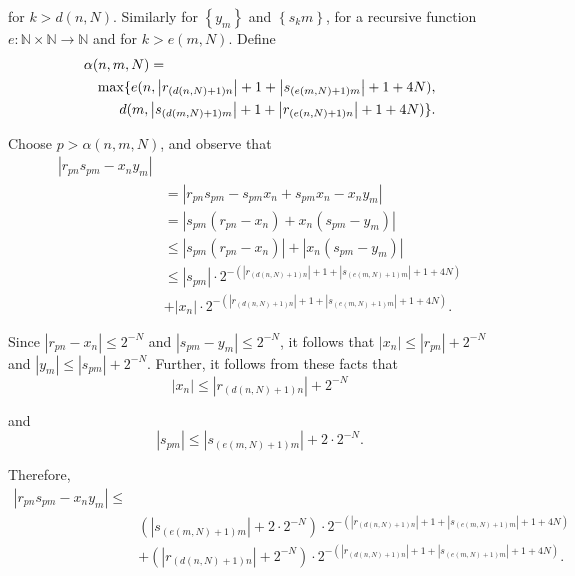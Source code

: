 \documentclass[a4paper,10pt]{article}
\begin{document}
for $k > d(n, N)$.  Similarly for $\left\{y_m\right\}$ and $\left\{s_km\right\}$, for a recursive function \newline$e:\mathbb{N}\times\mathbb{N}\to\mathbb{N}$ and for $k > e(m, N)$.  Define
\begin{align*}
 \lefteqn{\alpha(n,m,N) = } \\
 & & \max\{e(n,\left|r_{(d(n,N)+1)n}\right| + 1 + \left|s_{(e(m,N)+1)m}\right| + 1 + 4N), \\
 & & d(m,\left|s_{(d(m,N)+1)m}\right| + 1 + \left|r_{(e(n,N)+1)n}\right| + 1 + 4N)\}.
\end{align*}


Choose $p > \alpha(n,m,N)$, and observe that
\begin{align*}
\left|r_{pn}s_{pm} - x_{n}y_{m}\right| \\
& = \left|r_{pn}s_{pm} - s_{pm}x_n + s_{pm}x_n - x_{n}y_{m}\right|  \\
& = \left|s_{pm}\left(r_{pn} - x_n\right) + x_n\left(s_{pm} - y_m\right)\right| \\
& \leq \left|s_{pm}\left(r_{pn} - x_n\right)\right| + \left|x_n\left(s_{pm} - y_m\right)\right| \\
& \leq \left|s_{pm}\right| \cdot 2^{-\left(\left|r_{(d(n,N)+1)n}\right| + 1 + \left|s_{(e(m,N)+1)m}\right| + 1 + 4N\right)} \\ 
& + \left|x_n\right| \cdot 2^{-\left(\left|r_{(d(n,N)+1)n}\right| + 1 + \left|s_{(e(m,N)+1)m}\right| + 1 + 4N\right)}.
\end{align*}

Since $\left|r_{pn} - x_n\right| \leq 2^{-N}$ and $\left|s_{pm} - y_m\right| \leq 2^{-N}$, it follows that $\left|x_n\right| \leq \left|r_{pn}\right| + 2^{-N}$ and $\left|y_m\right| \leq \left|s_{pm}\right| + 2^{-N}$.  Further, it follows from these facts that
\[\left|x_n\right| \leq \left|r_{(d(n,N)+1)n}\right| + 2^{-N}\]

and
\[\left|s_{pm}\right| \leq \left|s_{(e(m,N)+1)m}\right| + 2\cdot2^{-N}.\]

Therefore, 
\begin{align*}
\left|r_{pn}s_{pm} - x_{n}y_{m}\right| \leq \\
& \left(\left|s_{(e(m,N)+1)m}\right| + 2\cdot2^{-N}\right)\cdot 2^{-\left(\left|r_{(d(n,N)+1)n}\right| + 1 + \left|s_{(e(m,N)+1)m}\right| + 1 + 4N\right)} \\
& + \left(\left|r_{(d(n,N)+1)n}\right| + 2^{-N}\right)\cdot 2^{-\left(\left|r_{(d(n,N)+1)n}\right| + 1 + \left|s_{(e(m,N)+1)m}\right| + 1 + 4N\right)}.
\end{align*}
\end{document}
